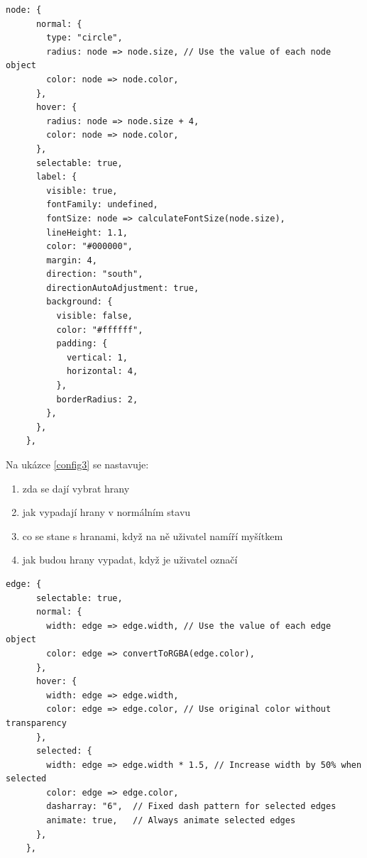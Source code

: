 \begin{lstlisting}[style=JavaScript, firstnumber = 87, caption={config/mapNetworkConfig.ts, druhá část konfigurace vNG},
label = {config2}]
    node: {
      normal: {
        type: "circle",
        radius: node => node.size, // Use the value of each node object
        color: node => node.color,
      },
      hover: {
        radius: node => node.size + 4,
        color: node => node.color,
      },
      selectable: true,
      label: {
        visible: true,
        fontFamily: undefined,
        fontSize: node => calculateFontSize(node.size),
        lineHeight: 1.1,
        color: "#000000",
        margin: 4,
        direction: "south",
        directionAutoAdjustment: true,
        background: {
          visible: false,
          color: "#ffffff",
          padding: {
            vertical: 1,
            horizontal: 4,
          },
          borderRadius: 2,
        },
      },
    },
\end{lstlisting}
\newpage
Na ukázce \ref{config3} se nastavuje:
\begin{enumerate}
    \item zda se dají vybrat hrany
    \item jak vypadají hrany v normálním stavu
    \item co se stane s hranami, když na ně uživatel namíří myšítkem
    \item jak budou hrany vypadat, když je uživatel označí
\end{enumerate}
\begin{lstlisting}[style=JavaScript, firstnumber = 118, caption={config/mapNetworkConfig.ts, třetí část konfigurace vNG},
label = {config3}]
edge: {
      selectable: true,
      normal: {
        width: edge => edge.width, // Use the value of each edge object
        color: edge => convertToRGBA(edge.color),
      },
      hover: {
        width: edge => edge.width,
        color: edge => edge.color, // Use original color without transparency
      },
      selected: {
        width: edge => edge.width * 1.5, // Increase width by 50% when selected
        color: edge => edge.color,
        dasharray: "6",  // Fixed dash pattern for selected edges
        animate: true,   // Always animate selected edges
      },
    },
\end{lstlisting}

